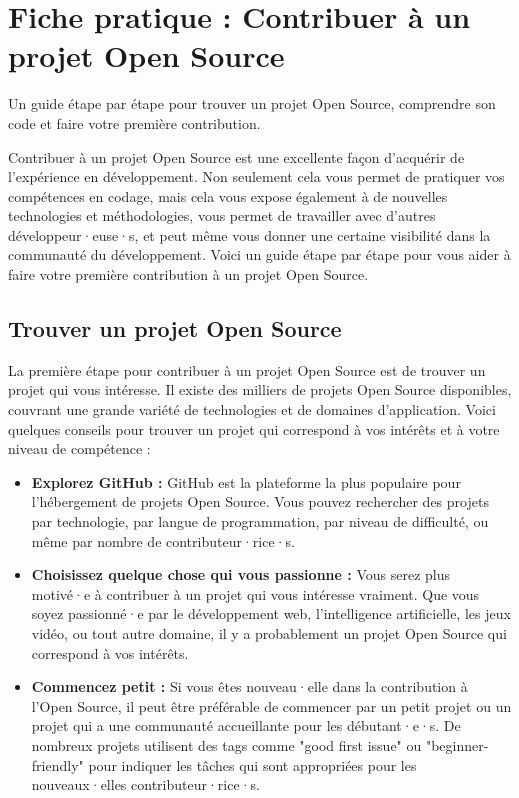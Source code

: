 \chapter{Fiche pratique : Contribuer à un projet Open Source}

Un guide étape par étape pour trouver un projet Open Source, comprendre son code et faire votre première contribution.

Contribuer à un projet Open Source est une excellente façon d'acquérir de l'expérience en développement. Non seulement cela vous permet de pratiquer vos compétences en codage, mais cela vous expose également à de nouvelles technologies et méthodologies, vous permet de travailler avec d'autres développeur·euse·s, et peut même vous donner une certaine visibilité dans la communauté du développement. Voici un guide étape par étape pour vous aider à faire votre première contribution à un projet Open Source.

\section{Trouver un projet Open Source}

La première étape pour contribuer à un projet Open Source est de trouver un projet qui vous intéresse. Il existe des milliers de projets Open Source disponibles, couvrant une grande variété de technologies et de domaines d'application. Voici quelques conseils pour trouver un projet qui correspond à vos intérêts et à votre niveau de compétence :

\begin{itemize}
    \item \textbf{Explorez GitHub :} GitHub est la plateforme la plus populaire pour l'hébergement de projets Open Source. Vous pouvez rechercher des projets par technologie, par langue de programmation, par niveau de difficulté, ou même par nombre de contributeur·rice·s.
    \item \textbf{Choisissez quelque chose qui vous passionne :} Vous serez plus motivé·e à contribuer à un projet qui vous intéresse vraiment. Que vous soyez passionné·e par le développement web, l'intelligence artificielle, les jeux vidéo, ou tout autre domaine, il y a probablement un projet Open Source qui correspond à vos intérêts.
    \item \textbf{Commencez petit :} Si vous êtes nouveau·elle dans la contribution à l'Open Source, il peut être préférable de commencer par un petit projet ou un projet qui a une communauté accueillante pour les débutant·e·s. De nombreux projets utilisent des tags comme "good first issue" ou "beginner-friendly" pour indiquer les tâches qui sont appropriées pour les nouveaux·elles contributeur·rice·s.
\end{itemize}

